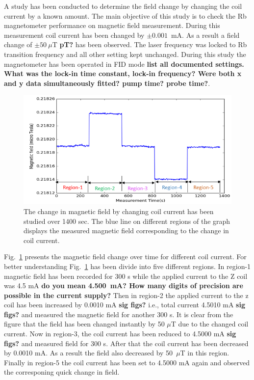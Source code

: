 A study has been conducted to determine the field change by changing
the coil current by a known amount. The main objective of this study
is to check the Rb magnetometer performance on magnetic field
measurement. During this measurement coil current has been changed by
$\pm 0.001$~mA. As a result a field change of $\pm 50~\mu$T {\bf pT?}
has been observed. The laser frequency was locked to Rb transition
frequency and all other setting kept unchanged. During this study the
magnetometer has been operated in FID mode {\bf list all documented
  settings.  What was the lock-in time constant, lock-in frequency?
  Were both x and y data simultaneously fitted?  pump time?  probe
  time?}.
\begin{figure}%
\centering\includegraphics[width=0.7\linewidth]{figures/field_change_with_current}
  
\caption{The change in magnetic field  by changing coil current has been studied over 1400 sec. The blue line on different regions of the graph displays the measured magnetic field corresponding to the change in coil current. \label{fig:field-change}}
\end{figure} 
 
Fig.~\ref{fig:field-change} presents the magnetic field change over
time for different coil current. For better understanding
Fig.~\ref{fig:field-change} has been divide into five different
regions. In region-1 magnetic field has been recorded for 300 s while
the applied current to the Z coil was 4.5 mA {\bf do you mean
  4.500~mA?%
  How many digits of precision are possible in the current
  supply? }%
  Then in region-2 the applied current to the z coil has
been increased by 0.0010 mA {\bf sig figs?} i.e., total current 4.5010
mA {\bf sig figs?} and measured the magnetic field for another 300
s. It is clear from the figure that the field has been changed
instantly by 50 $\mu$T due to the changed coil current. Now in
region-3, the coil current has been reduced to 4.5000 mA {\bf sig figs?}
and measured field for 300 s. After that the coil current has been
decreased by 0.0010 mA. As a result the field also decreased by
50~$\mu$T in this region.  Finally in region-5 the coil current has
been set to 4.5000 mA again and observed the corresponing quick change in
field.

